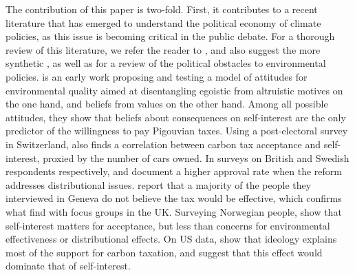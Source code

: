 \documentclass[11pt]{article}
\begin{document}
The contribution of this paper is two-fold. First, it contributes to a recent literature that has emerged to understand the political economy of climate policies, as this issue is becoming critical in the public debate. For a thorough review of this literature, we refer the reader to  \citet{carattini_overcoming_2018}, and also suggest the more synthetic \citet{klenert_making_2018}, as well as \citet{millner_beliefs_2016} for a review of the political obstacles to environmental policies. \citet{stern_value_1993} is an early work proposing and testing a model of attitudes for environmental quality aimed at disentangling egoistic from altruistic motives on the one hand, and beliefs from values on the other hand. Among all possible attitudes, they show that beliefs about consequences on self-interest are the only predictor of the willingness to pay Pigouvian taxes. Using a post-electoral survey in Switzerland, \citet{thalmann_public_2004} also finds a correlation between carbon tax acceptance and self-interest, proxied by the number of cars owned. In surveys on British and Swedish respondents respectively, \citet{bristow_public_2010} and \citet{brannlund_tax_2012} document a higher approval rate when the reform addresses distributional issues. \citet{baranzini_effectiveness_2017} report that a majority of the people they interviewed in Geneva do not believe the tax would be effective, which confirms what \citet{dresner_history_2006} find with focus groups in the UK. Surveying Norwegian people, \citet{kallbekken_saelen_2011} show that self-interest matters for acceptance, but less than concerns for environmental effectiveness or distributional effects. On US data, \citet{anderson_can_2019} show that ideology explains most of the support for carbon taxation, and suggest that this effect would dominate that of self-interest.
\end{document}
